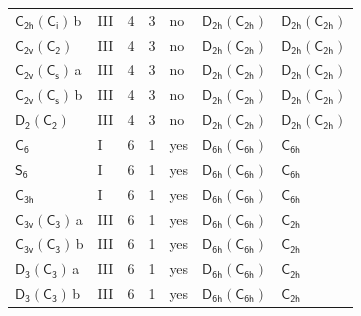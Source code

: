 \documentclass[10pt,a4paper]{article}
\numberwithin{equation}{section}
\newcommand{\grp}[1]{\mathsf{#1}}
\newcommand{\clsletter}[1]{\,{\scriptsize\color{black!55}#1}}
\begin{document}
{\begin{longtable}{@{}llrrlll@{}}
\href{C2h-S2.pdf}{$\grp{C_{2h}}(\grp{C_{i}})$}\clsletter{b} & III & 4 & 3 & no & \href{D2h-C2h.pdf}{$\grp{D_{2h}}(\grp{C_{2h}})$} & \href{D2h-C2h.pdf}{$\grp{D_{2h}}(\grp{C_{2h}})$}\\
\href{C2v-C2.pdf}{$\grp{C_{2v}}(\grp{C_{2}})$} & III & 4 & 3 & no & \href{D2h-C2h.pdf}{$\grp{D_{2h}}(\grp{C_{2h}})$} & \href{D2h-C2h.pdf}{$\grp{D_{2h}}(\grp{C_{2h}})$}\\
\href{C2v-C1v.pdf}{$\grp{C_{2v}}(\grp{C_{s}})$}\clsletter{a} & III & 4 & 3 & no & \href{D2h-C2h.pdf}{$\grp{D_{2h}}(\grp{C_{2h}})$} & \href{D2h-C2h.pdf}{$\grp{D_{2h}}(\grp{C_{2h}})$}\\
\href{C2v-C1v.pdf}{$\grp{C_{2v}}(\grp{C_{s}})$}\clsletter{b} & III & 4 & 3 & no & \href{D2h-C2h.pdf}{$\grp{D_{2h}}(\grp{C_{2h}})$} & \href{D2h-C2h.pdf}{$\grp{D_{2h}}(\grp{C_{2h}})$}\\
\href{D2-C2.pdf}{$\grp{D_{2}}(\grp{C_{2}})$} & III & 4 & 3 & no & \href{D2h-C2h.pdf}{$\grp{D_{2h}}(\grp{C_{2h}})$} & \href{D2h-C2h.pdf}{$\grp{D_{2h}}(\grp{C_{2h}})$}\\
\href{../../../rotation/data/pdf/C6.pdf}{$\grp{C_{6}}$} & I & 6 & 1 & yes & \href{D6h-C6h.pdf}{$\grp{D_{6h}}(\grp{C_{6h}})$} & \href{../../../rotation/data/pdf/C6h.pdf}{$\grp{C_{6h}}$}\\
\href{../../../rotation/data/pdf/S6.pdf}{$\grp{S_{6}}$} & I & 6 & 1 & yes & \href{D6h-C6h.pdf}{$\grp{D_{6h}}(\grp{C_{6h}})$} & \href{../../../rotation/data/pdf/C6h.pdf}{$\grp{C_{6h}}$}\\
\href{../../../rotation/data/pdf/C3h.pdf}{$\grp{C_{3h}}$} & I & 6 & 1 & yes & \href{D6h-C6h.pdf}{$\grp{D_{6h}}(\grp{C_{6h}})$} & \href{../../../rotation/data/pdf/C6h.pdf}{$\grp{C_{6h}}$}\\
\href{C3v-C3.pdf}{$\grp{C_{3v}}(\grp{C_{3}})$}\clsletter{a} & III & 6 & 1 & yes & \href{D6h-C6h.pdf}{$\grp{D_{6h}}(\grp{C_{6h}})$} & \href{../../../rotation/data/pdf/C2h.pdf}{$\grp{C_{2h}}$}\\
\href{C3v-C3.pdf}{$\grp{C_{3v}}(\grp{C_{3}})$}\clsletter{b} & III & 6 & 1 & yes & \href{D6h-C6h.pdf}{$\grp{D_{6h}}(\grp{C_{6h}})$} & \href{../../../rotation/data/pdf/C2h.pdf}{$\grp{C_{2h}}$}\\
\href{D3-C3.pdf}{$\grp{D_{3}}(\grp{C_{3}})$}\clsletter{a} & III & 6 & 1 & yes & \href{D6h-C6h.pdf}{$\grp{D_{6h}}(\grp{C_{6h}})$} & \href{../../../rotation/data/pdf/C2h.pdf}{$\grp{C_{2h}}$}\\
\href{D3-C3.pdf}{$\grp{D_{3}}(\grp{C_{3}})$}\clsletter{b} & III & 6 & 1 & yes & \href{D6h-C6h.pdf}{$\grp{D_{6h}}(\grp{C_{6h}})$} & \href{../../../rotation/data/pdf/C2h.pdf}{$\grp{C_{2h}}$}\\

\end{longtable}}
\end{document}
